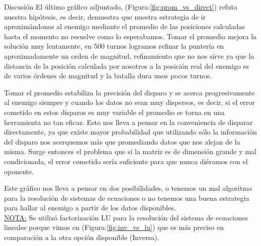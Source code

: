 \begin{section}{Discusión}
	El último gráfico adjuntado, (Figura:\ref{fig:prom_vs_direct}) refuta nuestra hipótesis, es decir, demuestra que nuestra estrategia de ir aproximándonos al enemigo mediante el promedio de las posiciones calculadas hasta el momento no resuelve como lo esperabamos. Tomar el promedio mejora la solución muy lentamente, en $500$ turnos logramos refinar la puntería en aproximadamente un orden de magnitud, refinamiento que no nos sirve ya que la distancia de la posición calculada por nosotros a la posición real del enemigo es de varios órdenes de magnitud y la batalla dura unos pocos turnos.
	
	Tomar el promedio estabiliza la precisión del disparo y se acerca progresivamente al enemigo siempre y cuando los datos no sean muy dispersos, es decir, si el error cometido en estos disparos es muy variable el promedio se torna en una herramienta no tan eficaz. Esto nos lleva a pensar en la conveniencia de disparar directamente, ya que existe mayor probabilidad que utilizando sólo la información del disparo nos acerquemos más que promediando datos que nos alejan de la misma. Surge entonces el problema que si la matriz es de dimensión grande y mal condicionada, el error cometido sería suficiente para que nunca diéramos con el oponente.
	
	Este gráfico nos lleva a pensar en dos posibilidades, o tenemos un mal algoritmo para la resolución de sistemas de ecuaciones o no tenemos una buena estrategia para hallar al enemigo a partir de los datos disponibles.\\

	\underline{NOTA:} Se utilizó factorización LU para la resolución del sistema de ecuaciones lineales porque vimos en (Figura:\ref{fig:inv_vs_lu}) que es más preciso en comparación a la otra opción disponible (Inversa). 

\end{section}
